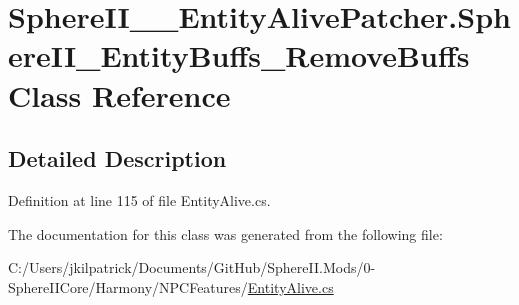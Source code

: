 \hypertarget{class_sphere_i_i_____entity_alive_patcher_1_1_sphere_i_i___entity_buffs___remove_buffs}{}\section{Sphere\+I\+I\+\_\+\+\_\+\+Entity\+Alive\+Patcher.\+Sphere\+I\+I\+\_\+\+Entity\+Buffs\+\_\+\+Remove\+Buffs Class Reference}
\label{class_sphere_i_i_____entity_alive_patcher_1_1_sphere_i_i___entity_buffs___remove_buffs}


\subsection{Detailed Description}


Definition at line 115 of file Entity\+Alive.\+cs.



The documentation for this class was generated from the following file\+:\begin{DoxyCompactItemize}
\item 
C\+:/\+Users/jkilpatrick/\+Documents/\+Git\+Hub/\+Sphere\+I\+I.\+Mods/0-\/\+Sphere\+I\+I\+Core/\+Harmony/\+N\+P\+C\+Features/\mbox{\hyperlink{_entity_alive_8cs}{Entity\+Alive.\+cs}}\end{DoxyCompactItemize}
